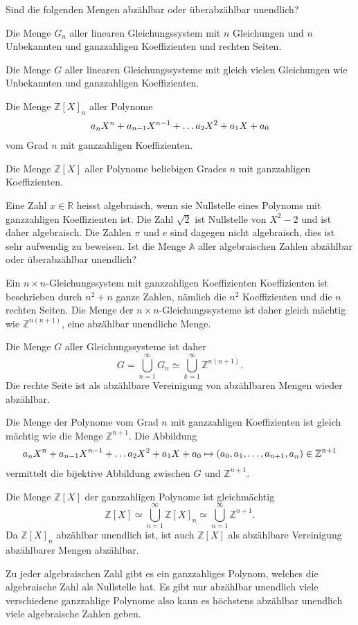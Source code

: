 Sind die folgenden Mengen abzählbar oder überabzählbar unendlich?
\begin{teilaufgaben}
\item
Die Menge $G_n$ aller linearen Gleichungssystem mit $n$ Gleichungen
und $n$ Unbekannten und ganzzahligen Koeffizienten und rechten Seiten.
\item
Die Menge $G$ aller linearen Gleichungssysteme mit gleich vielen Gleichungen
wie Unbekannten und ganzzahligen Koeffizienten.
\item
Die Menge $\mathbb Z[X]_n$ aller Polynome
\[
a_{\mathstrut n}X^n+a_{n-1}X^{n-1}+\dots a_2X^2+a_1X+a_0
\]
vom Grad $n$ mit ganzzahligen Koeffizienten.
\item
Die Menge $\mathbb Z[X]$ aller Polynome
beliebigen Grades $n$ mit ganzzahligen Koeffizienten.
\item
Eine Zahl $x\in \mathbb R$ heisst algebraisch, wenn sie Nullstelle
eines Polynoms mit ganzzahligen Koeffizienten ist.
Die Zahl $\sqrt{2}$ ist Nullstelle von $X^2-2$ und ist daher algebraisch.
Die Zahlen $\pi$ und $e$ sind dagegen nicht algebraisch, dies ist sehr
aufwendig zu beweisen.
Ist die Menge $\mathbb{A}$ aller algebraischen Zahlen abzählbar oder
überabzählbar unendlich?
\end{teilaufgaben}

\begin{loesung}
\begin{teilaufgaben}
\item
Ein $n\times n$-Gleichungssystem mit ganzzahligen Koeffizienten
Koeffizienten ist beschrieben durch $n^2+n$ ganze Zahlen, nämlich
die $n^2$ Koeffizienten und die $n$ rechten Seiten.
Die Menge der $n\times n$-Gleichungssysteme ist daher gleich
mächtig wie $\mathbb Z^{n(n+1)}$, eine abzählbar unendliche Menge.
\item
Die Menge $G$ aller Gleichungssysteme ist daher 
\[
G = \bigcup_{n=1}^\infty G_n \simeq \bigcup_{k=1}^\infty \mathbb Z^{n(n+1)}.
\]
Die rechte Seite ist als abzählbare Vereinigung von abzählbaren Mengen
wieder abzählbar.
\item
Die Menge der Polynome vom Grad $n$ mit ganzzahligen Koeffizienten
ist gleich mächtig wie die Menge $\mathbb Z^{n+1}$.
Die Abbildung
\[
a_{\mathstrut n}X^n+a_{n-1}X^{n-1}+\dots a_2X^2+a_1X+a_0
\mapsto
(a_0,a_1,\dots,a_{n+1},a_{\mathstrut n}) \in \mathbb{Z}^{n+1}
\]
vermittelt die bijektive Abbildung zwischen $G$ und $\mathbb Z^{n+1}$.
\item
Die Menge $\mathbb Z[X]$ der ganzzahligen Polynome ist gleichmächtig
\[
\mathbb Z[X]
\simeq
\bigcup_{n=1}^\infty \mathbb Z[X]_n
\simeq
\bigcup_{n=1}^\infty \mathbb Z^{n+1}.
\]
Da $\mathbb Z[X]_n$ abzählbar unendlich ist, ist auch $\mathbb Z[X]$
als abzählbare Vereinigung abzählbarer Mengen abzählbar.
\item
Zu jeder algebraischen Zahl gibt es ein ganzzahliges Polynom, welches
die algebraische Zahl als Nullstelle hat.
Es gibt nur abzählbar unendlich viele verschiedene ganzzahlige Polynome
also kann es höchstens abzählbar unendlich viele algebraische Zahlen geben.
\qedhere
\end{teilaufgaben}
\end{loesung}


